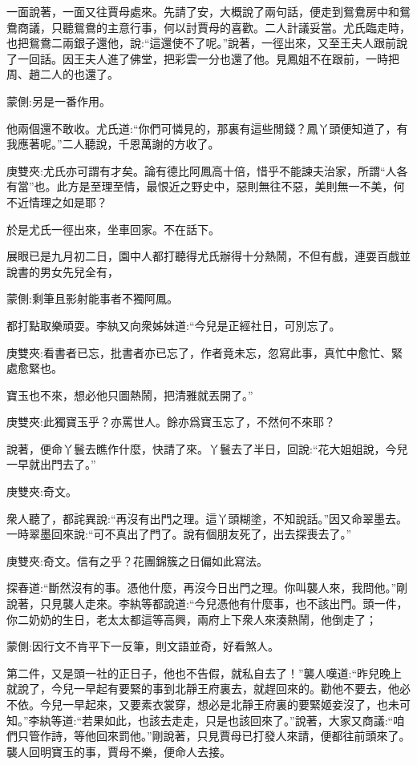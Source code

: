 \begin{parag}
    一面說著，一面又往賈母處來。先請了安，大概說了兩句話，便走到鴛鴦房中和鴛鴦商議，只聽鴛鴦的主意行事，何以討賈母的喜歡。二人計議妥當。尤氏臨走時，也把鴛鴦二兩銀子還他，說:“這還使不了呢。”說著，一徑出來，又至王夫人跟前說了一回話。因王夫人進了佛堂，把彩雲一分也還了他。見鳳姐不在跟前，一時把周、趙二人的也還了。\begin{note}蒙側:另是一番作用。\end{note}他兩個還不敢收。尤氏道:“你們可憐見的，那裏有這些閒錢？鳳丫頭便知道了，有我應著呢。”二人聽說，千恩萬謝的方收了。\begin{note}庚雙夾:尤氏亦可謂有才矣。論有德比阿鳳高十倍，惜乎不能諫夫治家，所謂“人各有當”也。此方是至理至情，最恨近之野史中，惡則無往不惡，美則無一不美，何不近情理之如是耶？\end{note}於是尤氏一徑出來，坐車回家。不在話下。
\end{parag}


\begin{parag}
    展眼已是九月初二日，園中人都打聽得尤氏辦得十分熱鬧，不但有戲，連耍百戲並說書的男女先兒全有，\begin{note}蒙側:剩筆且影射能事者不獨阿鳳。\end{note}都打點取樂頑耍。李紈又向衆姊妹道:“今兒是正經社日，可別忘了。\begin{note}庚雙夾:看書者已忘，批書者亦已忘了，作者竟未忘，忽寫此事，真忙中愈忙、緊處愈緊也。\end{note}寶玉也不來，想必他只圖熱鬧，把清雅就丟開了。”\begin{note}庚雙夾:此獨寶玉乎？亦罵世人。餘亦爲寶玉忘了，不然何不來耶？\end{note}說著，便命丫鬟去瞧作什麼，快請了來。丫鬟去了半日，回說:“花大姐姐說，今兒一早就出門去了。”\begin{note}庚雙夾:奇文。\end{note}衆人聽了，都詫異說:“再沒有出門之理。這丫頭糊塗，不知說話。”因又命翠墨去。一時翠墨回來說:“可不真出了門了。說有個朋友死了，出去探喪去了。”\begin{note}庚雙夾:奇文。信有之乎？花團錦簇之日偏如此寫法。\end{note}探春道:“斷然沒有的事。憑他什麼，再沒今日出門之理。你叫襲人來，我問他。”剛說著，只見襲人走來。李紈等都說道:“今兒憑他有什麼事，也不該出門。頭一件，你二奶奶的生日，老太太都這等高興，兩府上下衆人來湊熱鬧，他倒走了；\begin{note}蒙側:因行文不肯平下一反筆，則文語並奇，好看煞人。\end{note}第二件，又是頭一社的正日子，他也不告假，就私自去了！”襲人嘆道:“昨兒晚上就說了，今兒一早起有要緊的事到北靜王府裏去，就趕回來的。勸他不要去，他必不依。今兒一早起來，又要素衣裳穿，想必是北靜王府裏的要緊姬妾沒了，也未可知。”李紈等道:“若果如此，也該去走走，只是也該回來了。”說著，大家又商議:“咱們只管作詩，等他回來罰他。”剛說著，只見賈母已打發人來請，便都往前頭來了。襲人回明寶玉的事，賈母不樂，便命人去接。
\end{parag}


